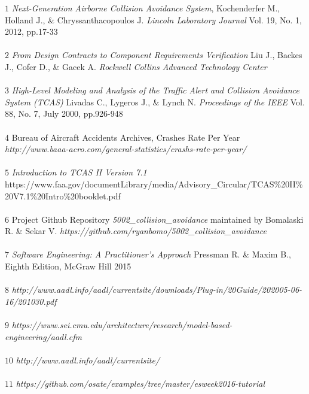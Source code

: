 \documentclass[12pt]{report}
\theoremstyle{plain}
\theoremstyle{definition}
\begin{document}
${1}$ \textit{Next-Generation Airborne Collision Avoidance System}, Kochenderfer M., Holland J., \&  Chryssanthacopoulos J. \textit{Lincoln Laboratory Journal} Vol. 19, No. 1, 2012, pp.17-33
\\
\\
${2}$ \textit{From Design Contracts to Component Requirements Verification} Liu J., Backes J., Cofer D., \& Gacek A. \textit{Rockwell Collins Advanced Technology Center}
\\
\\
${3}$ \textit{High-Level Modeling and Analysis of the Traffic Alert and Collision Avoidance System (TCAS)} Livadas C., Lygeros J., \& Lynch N. \textit{Proceedings of the IEEE} Vol. 88, No. 7, July 2000, pp.926-948
\\
\\
${4}$ Bureau of Aircraft Accidents Archives, Crashes Rate Per Year \textit{http://www.baaa-acro.com/general-statistics/crashs-rate-per-year/}
\\
\\
${5}$ \textit{Introduction to TCAS II Version 7.1} https://www.faa.gov/documentLibrary/media/Advisory\_Circular/TCAS\%20II\%20V7.1\%20Intro\%20booklet.pdf
\\
\\
${6}$ Project Github Repository \textit{5002\_collision\_avoidance} maintained by Bomalaski R. \& Sekar V. \textit{https://github.com/ryanbomo/5002\_collision\_avoidance}
\\
\\
${7}$ \textit{Software Engineering: A Practitioner's Approach} Pressman R. \& Maxim B., Eighth Edition, McGraw Hill 2015
\\
\\
${8}$ \textit{http://www.aadl.info/aadl/currentsite/downloads/Plug-in/20Guide/202005-06-16/201030.pdf}
\\
\\
${9}$ \textit{https://www.sei.cmu.edu/architecture/research/model-based-engineering/aadl.cfm}
\\
\\
${10}$ \textit{http://www.aadl.info/aadl/currentsite/}
\\
\\
${11}$ \textit{https://github.com/osate/examples/tree/master/esweek2016-tutorial}
\\
\\
\end{document}
